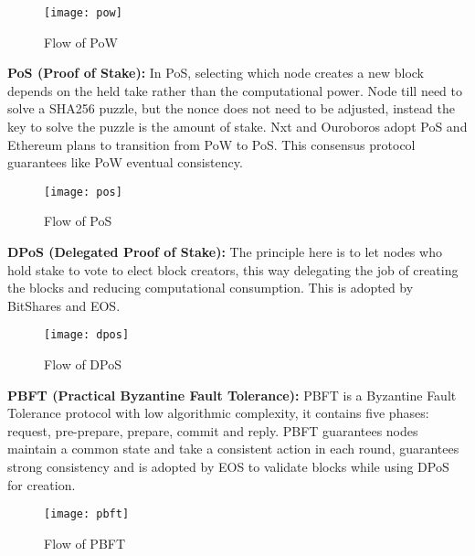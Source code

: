 \begin{figure}[h]
	\centering
	\texttt{[image: pow]}
	\caption{Flow of PoW}
	\label{fig:pow}
\end{figure}

\textbf{PoS (Proof of Stake):} In PoS, selecting which node creates a new block
depends on the held take rather than the computational power. Node till need to solve
a SHA256 puzzle, but the nonce does not need to be adjusted, instead the key to solve
the puzzle is the amount of stake. Nxt and Ouroboros adopt PoS and Ethereum plans to
transition from PoW to PoS. This consensus protocol guarantees like
PoW eventual consistency. 

\begin{figure}[h]
	\centering
	\texttt{[image: pos]}
	\caption{Flow of PoS}
	\label{fig:pos}
\end{figure}


\textbf{DPoS (Delegated Proof of Stake):} The principle here is to let nodes who
hold stake to vote to elect block creators, this way delegating the job of creating
the blocks and reducing computational consumption. This is adopted by BitShares and EOS.

\begin{figure}[h]
	\centering
	\texttt{[image: dpos]}
	\caption{Flow of DPoS}
	\label{fig:dpos}
\end{figure}

\textbf{PBFT (Practical Byzantine Fault Tolerance):} PBFT is a Byzantine Fault 
Tolerance protocol with low algorithmic complexity, it contains five phases: request,
pre-prepare, prepare, commit and reply. PBFT guarantees nodes maintain a common state and take
a consistent action in each round, guarantees strong consistency and is adopted by
EOS to validate blocks while using DPoS for creation.

\begin{figure}[h]
	\centering
	\texttt{[image: pbft]}
	\caption{Flow of PBFT}
	\label{fig:pbft}
\end{figure}